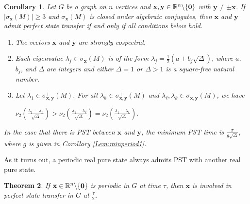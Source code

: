 \documentclass[11pt]{article}
\newtheorem{theorem}{Theorem}
\newtheorem{corollary}[theorem]{Corollary}
\newcommand{\zero}{{\bf{0}}}
\newcommand{\bx}{\mathbf x}
\newcommand{\by}{\mathbf y}
\def\R{\mathbb{R}}
\begin{document}
\begin{corollary}
\label{Cor:PSTcharcor}
Let $G$ be a graph on $n$ vertices and $\bx,\by \in\R^n\backslash\{\zero\}$ with $\by\neq \pm\bx$. If $|\sigma_{\bx}(M)|\geq 3$ and $\sigma_{\bx}(M)$ is closed under algebraic conjugates, then $\bx$ and $\by$ admit perfect state transfer if and only if all conditions below hold.
\begin{enumerate}
\item The vectors $\bx$ and $\by$ are strongly cospectral.
\item Each eigenvalue $\lambda_j\in\sigma_{\bx}(M)$ is of the form $\lambda_j=\frac{1}{2}(a+b_j\sqrt{\Delta})$, where $a$, $b_j$, and $\Delta$ are integers and either $\Delta=1$ or $\Delta>1$ is a square-free natural number.
\item Let $\lambda_1\in\sigma_{\bx,\by}^+(M)$. For all $\lambda_h\in\sigma_{\bx,\by}^+(M)$ and $\lambda_{\ell},\lambda_k\in\sigma_{\bx,\by}^-(M)$, we have
\begin{center}
$\nu_2\left(\frac{\lambda_1-\lambda_{h}}{\sqrt{\Delta}}\right)>\nu_2\left(\frac{\lambda_1-\lambda_{\ell}}{\sqrt{\Delta}}\right)=\nu_2\left(\frac{\lambda_1-\lambda_{k}}{\sqrt{\Delta}}\right).$
\end{center}
\end{enumerate}
In the case that there is PST between $\bx$ and $\by$, the minimum PST time is $\frac{\pi}{g\sqrt{\Delta}}$, where $g$ is given in Corollary \ref{Lem:minperiod1}.
\end{corollary}

As it turns out, a periodic real pure state always admits PST with another real pure state.

\begin{theorem}
\label{Thm:PSTany}
If $\bx\in\R^n\backslash\{\zero\}$ is periodic in $G$ at time $\tau$, then $\bx$ is involved in perfect state transfer in $G$ at $\frac{\tau}{2}$.
\end{theorem}
\end{document}
